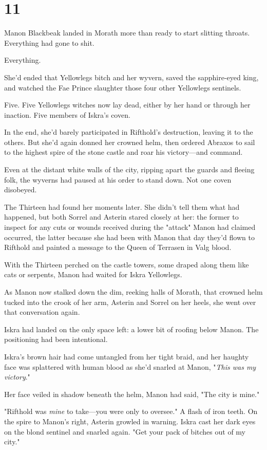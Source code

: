 
\chapter{11}

Manon Blackbeak landed in Morath more than ready to start slitting throats. Everything had gone to shit.

Everything.

She'd ended that Yellowlegs bitch and her wyvern, saved the sapphire-eyed king, and watched the Fae Prince slaughter those four other Yellowlegs sentinels.

Five. Five Yellowlegs witches now lay dead, either by her hand or through her inaction. Five members of Iskra's coven.

In the end, she'd barely participated in Rifthold's destruction, leaving it to the others. But she'd again donned her crowned helm, then ordered Abraxos to sail to the highest spire of the stone castle and roar his victory---and command.

Even at the distant white walls of the city, ripping apart the guards and fleeing folk, the wyverns had paused at his order to stand down. Not one coven disobeyed.

The Thirteen had found her moments later. She didn't tell them what had happened, but both Sorrel and Asterin stared closely at her: the former to inspect for any cuts or wounds received during the "attack" Manon had claimed occurred, the latter because she had been with Manon that day they'd flown to Rifthold and painted a message to the Queen of Terrasen in Valg blood.

With the Thirteen perched on the castle towers, some draped along them like cats or serpents, Manon had waited for Iskra Yellowlegs.

As Manon now stalked down the dim, reeking halls of Morath, that crowned helm tucked into the crook of her arm, Asterin and Sorrel on her heels, she went over that conversation again.

Iskra had landed on the only space left: a lower bit of roofing below Manon. The positioning had been intentional.

Iskra's brown hair had come untangled from her tight braid, and her haughty face was splattered with human blood as she'd snarled at Manon, "\emph{This was my victory}."

Her face veiled in shadow beneath the helm, Manon had said, "The city is mine."

"Rifthold was \emph{mine} to take---you were only to oversee." A flash of iron teeth. On the spire to Manon's right, Asterin growled in warning. Iskra cast her dark eyes on the blond sentinel and snarled again. "Get your pack of bitches out of my city."

